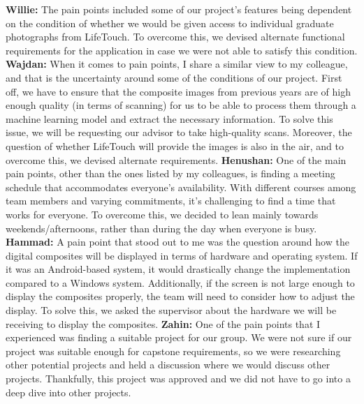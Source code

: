 \documentclass{article}
\begin{document}
\textbf{Willie:}  
The pain points included some of our project’s features being dependent on the condition of whether we would be given access to individual graduate photographs from LifeTouch. To overcome this, we devised alternate functional requirements for the application in case we were not able to satisfy this condition.
\newline
\newline
\textbf{Wajdan:}  
When it comes to pain points, I share a similar view to my colleague, and that is the uncertainty around some of the conditions of our project. First off, we have to ensure that the composite images from previous years are of high enough quality (in terms of scanning) for us to be able to process them through a machine learning model and extract the necessary information. To solve this issue, we will be requesting our advisor to take high-quality scans. Moreover, the question of whether LifeTouch will provide the images is also in the air, and to overcome this, we devised alternate requirements.
\newline
\newline
\textbf{Henushan:}  
One of the main pain points, other than the ones listed by my colleagues, is finding a meeting schedule that accommodates everyone's availability. With different courses among team members and varying commitments, it’s challenging to find a time that works for everyone. To overcome this, we decided to lean mainly towards weekends/afternoons, rather than during the day when everyone is busy.
\newline
\newline
\textbf{Hammad:}  
A pain point that stood out to me was the question around how the digital composites will be displayed in terms of hardware and operating system. If it was an Android-based system, it would drastically change the implementation compared to a Windows system. Additionally, if the screen is not large enough to display the composites properly, the team will need to consider how to adjust the display. To solve this, we asked the supervisor about the hardware we will be receiving to display the composites.
\newline
\textbf{Zahin:}  
\newline
One of the pain points that I experienced was finding a suitable project for our group. We were not sure if our project was suitable enough for capstone requirements, so we were researching other potential projects and held a discussion where we would discuss other projects. Thankfully, this project was approved and we did not have to go into a deep dive into other projects.
\end{document}

